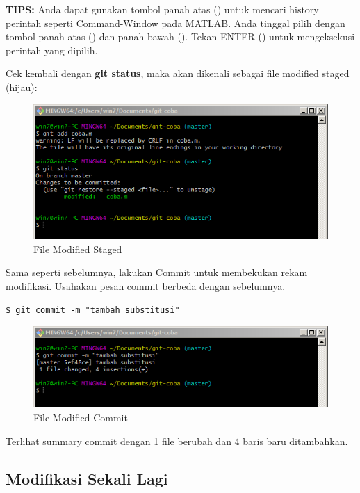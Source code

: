 \documentclass[12pt]{book}
\begin{document}
	\textbf{TIPS:} Anda dapat gunakan tombol panah atas (\keys{$\uparrow$}) untuk mencari history perintah seperti Command-Window pada MATLAB.
	Anda tinggal pilih dengan tombol panah atas (\keys{$\uparrow$}) dan panah bawah (\keys{$\downarrow$}).
	Tekan ENTER (\keys{\return}) untuk mengeksekusi perintah yang dipilih.

	\newpage
	Cek kembali dengan \textbf{git status}, maka akan dikenali sebagai file modified staged (hijau):
	\begin{figure}[!ht]
		\centering
		\includegraphics[width=400pt]{images/git8}
		\caption{File Modified Staged}
	\end{figure}

	Sama seperti sebelumnya, lakukan Commit untuk membekukan rekam modifikasi.
	Usahakan pesan commit berbeda dengan sebelumnya.
	\begin{verbatim}
$ git commit -m "tambah substitusi"
	\end{verbatim}

	\begin{figure}[!ht]
		\centering
		\includegraphics[width=400pt]{images/git9}
		\caption{File Modified Commit}
	\end{figure}

	Terlihat summary commit dengan 1 file berubah dan 4 baris baru ditambahkan.

	\subsection{Modifikasi Sekali Lagi}
\end{document}
